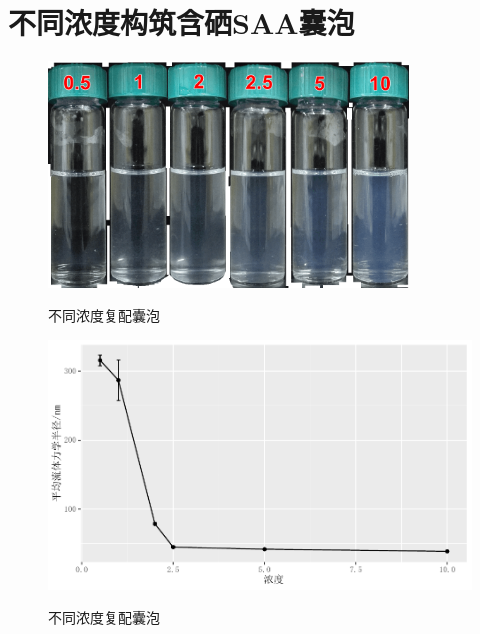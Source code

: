 \documentclass[bachelor,fandolfonts,replaceperiod]{jnuthesis} %
\begin{document}
        
        
    \section{不同浓度构筑含硒SAA囊泡}

    \begin{figure}[htbp]
        \centering
        \includegraphics[height=6cm]{Figure/123concentration.png}\\
        \caption{不同浓度复配囊泡}\label{fig:vesicle-concentration}
    \end{figure}


    \begin{figure}[htbp]
        \centering
        \includegraphics[width=0.8\linewidth]{Figure/test.pdf}\\
        \caption{不同浓度复配囊泡}\label{fig:vesicle-concentration-line}
    \end{figure}
\end{document}
